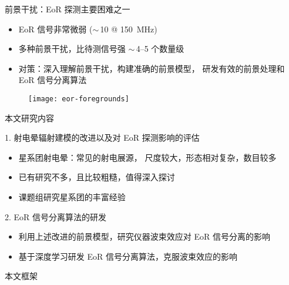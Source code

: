 \documentclass{beamer}
\begin{document}
\begin{frame}{前景干扰：EoR 探测主要困难之一}
  \begin{itemize}
    \item EoR 信号非常微弱 ($\sim$\,\SI{10}{\mK} @ \SI{150}{\MHz})
    \item \alert{多种前景干扰}，比待测信号强 $\sim$\,4--5 个数量级
    \item \alert{对策}：深入理解前景干扰，构建准确的前景模型，
      研发有效的前景处理和 EoR 信号分离算法
  \end{itemize}

  \vspace{-1ex}
  \begin{figure}
    \centering
    \texttt{[image: eor-foregrounds]}
  \end{figure}

\end{frame}

\begin{frame}{本文研究内容}
  \begin{alertblock}{1. 射电晕辐射建模的改进以及对 EoR 探测影响的评估}
    \begin{itemize}
      \item 星系团射电晕：常见的射电展源，
        尺度较大，形态相对复杂，数目较多
      \item 已有研究不多，且比较粗糙，值得深入探讨
      \item 课题组研究星系团的丰富经验
    \end{itemize}
  \end{alertblock}

  \begin{alertblock}{2. EoR 信号分离算法的研发}
    \begin{itemize}
      \item 利用上述改进的前景模型，研究仪器波束效应对 EoR 信号分离的影响
      \item 基于深度学习研发 EoR 信号分离算法，克服波束效应的影响
    \end{itemize}
  \end{alertblock}
\end{frame}

\begin{frame}{本文框架}
  \begin{figure}
  \end{figure}
\end{frame}
\end{document}
